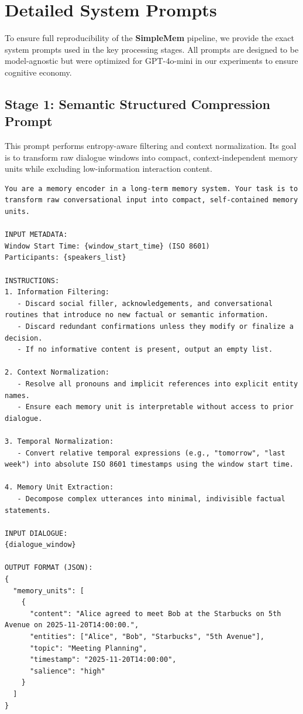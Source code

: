 \clearpage
\onecolumn
\appendix

\section{Detailed System Prompts}
\label{app:prompts}

To ensure full reproducibility of the \textbf{SimpleMem} pipeline, we provide the exact system prompts used in the key processing stages. All prompts are designed to be model-agnostic but were optimized for GPT-4o-mini in our experiments to ensure cognitive economy.

\subsection{Stage 1: Semantic Structured Compression Prompt}
\label{app:prompt_stage1}

This prompt performs entropy-aware filtering and context normalization. Its goal is to transform raw dialogue windows into compact, context-independent memory units while excluding low-information interaction content.

\begin{lstlisting}[caption={Prompt for Semantic Structured Compression and Normalization.}, label={lst:encoding_prompt}]
You are a memory encoder in a long-term memory system. Your task is to transform raw conversational input into compact, self-contained memory units.

INPUT METADATA:
Window Start Time: {window_start_time} (ISO 8601)
Participants: {speakers_list}

INSTRUCTIONS:
1. Information Filtering:
   - Discard social filler, acknowledgements, and conversational routines that introduce no new factual or semantic information.
   - Discard redundant confirmations unless they modify or finalize a decision.
   - If no informative content is present, output an empty list.

2. Context Normalization:
   - Resolve all pronouns and implicit references into explicit entity names.
   - Ensure each memory unit is interpretable without access to prior dialogue.

3. Temporal Normalization:
   - Convert relative temporal expressions (e.g., "tomorrow", "last week") into absolute ISO 8601 timestamps using the window start time.

4. Memory Unit Extraction:
   - Decompose complex utterances into minimal, indivisible factual statements.

INPUT DIALOGUE:
{dialogue_window}

OUTPUT FORMAT (JSON):
{
  "memory_units": [
    {
      "content": "Alice agreed to meet Bob at the Starbucks on 5th Avenue on 2025-11-20T14:00:00.",
      "entities": ["Alice", "Bob", "Starbucks", "5th Avenue"],
      "topic": "Meeting Planning",
      "timestamp": "2025-11-20T14:00:00",
      "salience": "high"
    }
  ]
}
\end{lstlisting}

